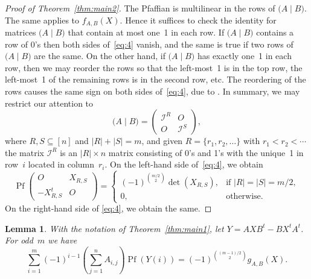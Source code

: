 \documentclass[12pt,reqno]{amsart}
\numberwithin{equation}{section}
\newtheorem{lemma}[theorem]{Lemma}
\theoremstyle{definition}
\theoremstyle{remark}
\def\Pf{\operatorname{Pf}}
\begin{document}
\begin{proof}[Proof of Theorem~\ref{thm:main2}]
The Pfaffian is multilinear in the rows of $\bigl(A\mid B\bigr)$.
The same applies to $f_{A,B}(X)$. Hence it suffices to check
the identity for matrices $\bigl(A\mid B\bigr)$ that contain at
most one~1 in each row. If $\bigl(A\mid B\bigr)$ contains a row of 0's then
both sides of~\eqref{eq:4} vanish, and the same is true if two
rows of $\bigl(A\mid B\bigr)$ are the same.
On the other hand, if $\bigl(A\mid B\bigr)$
has exactly one~1 in each row, then we may reorder the rows so that
the left-most~1 is in the top row, the left-most~1 of the remaining
rows is in the second row, etc. The reordering of the rows causes
the same sign on both sides of~\eqref{eq:4}, due to 
\cite[Prop.~2.3(b)]{StemAE}. 
In summary, we may restrict our attention to
$$
\bigl(A\mid B\bigr)=\begin{pmatrix}
\mathcal I^R&O\\
O&\mathcal I^S\end{pmatrix},
$$
where $R,S\subseteq[n]$ and $|R|+|S|=m$, and
given $R=\{r_1,r_2,\dots\}$ with $r_1<r_2<\cdots$ the matrix $\mathcal
I^R$ is
an $|R|\times n$ matrix consisting of 0's and 1's with the unique~1 in row~$i$
located in column~$r_i$. On the left-hand side of~\eqref{eq:4}, we obtain
$$
\Pf\begin{pmatrix} O&X_{R,S}\\-X_{R,S}^t&O\end{pmatrix}
=\begin{cases}
(-1)^{\binom {m/2}2}\det(X_{R,S}),&\text{if }|R|=|S|=m/2,\\
0,&\text{otherwise.}
\end{cases}
$$
On the right-hand side of \eqref{eq:4}, we obtain the same.
\end{proof}

\begin{lemma} \label{lem:2}
With the notation of Theorem~\ref{thm:main1}, let
$Y=AXB^t-BX^tA^t$.
For odd~$m$ we have
\begin{equation} \label{eq:6} 
\sum_{i=1}^m(-1)^{i-1}\left(\sum_{j=1}^nA_{i,j}\right)\Pf (Y(i))
=(-1)^{\binom {(m-1)/2}2}g_{A,B}(X).
\end{equation}
\end{lemma}
\end{document}
